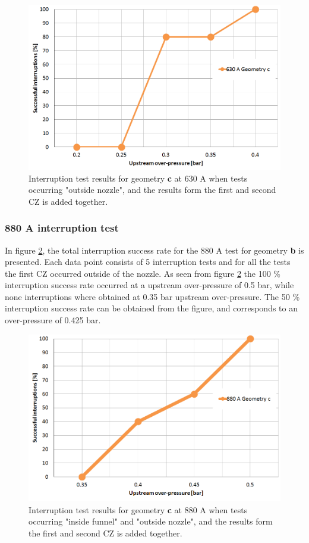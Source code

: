\documentclass[10pt,b5paper,twoside]{article}
\begin{document}
\begin{figure}[H]
\centering
\includegraphics[scale=0.45]{Bilder/Results/geoC630amp.png}
\caption{Interruption test results for geometry \textbf{c} at 630 A when tests occurring "outside nozzle", and the results form the first and second CZ is added together.} \label{fig:results630AgeoC}
\end{figure}

\subsubsection*{880 A interruption test}
In figure \ref{fig:results880AgeoC}, the total interruption success rate for the 880 A test for geometry \textbf{b} is presented. Each data point consists of 5 interruption tests and for all the tests the first CZ occurred outside of the nozzle. As seen from figure \ref{fig:results880AgeoC} the 100 \% interruption success rate occurred at a upstream over-pressure of 0.5 bar, while none interruptions where obtained at 0.35 bar upstream over-pressure. The 50 \% interruption success rate can be obtained from the figure, and corresponds to an over-pressure of 0.425 bar.

\begin{figure}[H]
\centering
\includegraphics[scale=0.45]{Bilder/Results/geoC880amp.png}
\caption{Interruption test results for geometry \textbf{c} at 880 A when tests occurring "inside funnel" and "outside nozzle", and the results form the first and second CZ is added together.} \label{fig:results880AgeoC}
\end{figure}
\end{document}
